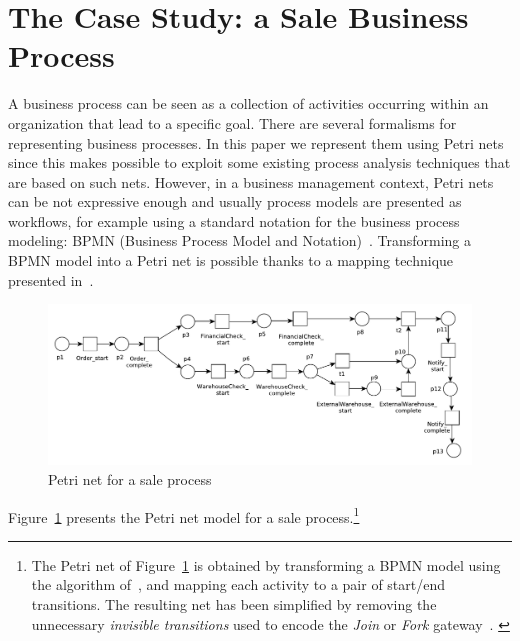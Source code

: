 \documentclass{llncs}
\begin{document}
\section{The Case Study: a Sale Business Process}\label{example}
A business process can be seen as a collection of activities occurring within an organization that lead to a specific goal. There are several formalisms for representing business processes. In this paper we represent them using Petri nets~\cite{DBLP:conf/ifip/Petri62,DBLP:journals/jcsc/Aalst98} since this makes possible to exploit some existing process analysis techniques that are based on such nets. However, in a business management context, Petri nets can be not expressive enough and usually process models are presented as workflows, for example using a standard notation for the business process modeling: BPMN (Business Process Model and Notation)~\cite{BPMN}. Transforming a BPMN model into a Petri net is possible thanks to a mapping technique presented in~\cite{DBLP:conf/wsfm/BruniCFFGS11}.
\begin{figure}[h]
\includegraphics[width=360pt]
{./items/Sales_PN.pdf}
\caption{Petri net for a sale process}
\label{pnet}
\end{figure}
%
Figure~\ref{pnet} presents the Petri net model for a sale
process.\footnote{\small{
The Petri net of Figure~\ref{pnet} is obtained by
transforming a BPMN model using the algorithm of~\cite{DBLP:conf/wsfm/BruniCFFGS11}, and mapping
each activity to a pair of start/end transitions. The resulting net
has been simplified by removing the unnecessary \emph{invisible
  transitions} used to encode the \emph{Join} or \emph{Fork} gateway~\cite{DBLP:conf/wsfm/BruniCFFGS11}.
}} 
\end{document}
